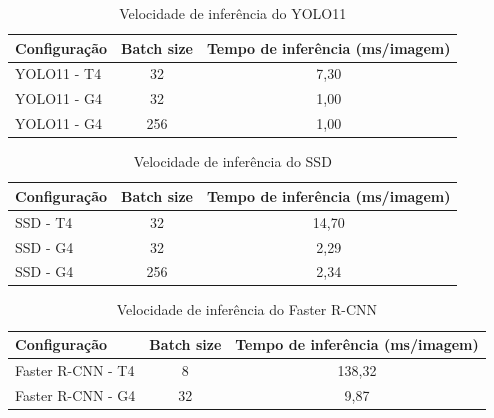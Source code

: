 \begin{table}[H]
    \caption{Velocidade de inferência do YOLO11}
    \label{tab:inferencia-yolo11}
    \centering
    \small
    \begin{tabular}{lcc}
        \toprule
        \textbf{Configuração} & \textbf{Batch size} & \textbf{Tempo de inferência (ms/imagem)} \\
        \midrule
        YOLO11 - T4  & 32  & 7,30 \\
        YOLO11 - G4  & 32  & 1,00 \\
        YOLO11 - G4  & 256 & 1,00 \\
        \bottomrule
    \end{tabular}
\end{table}
\vspace{-1em}

\begin{table}[H]
    \caption{Velocidade de inferência do SSD}
    \label{tab:inferencia-ssd}
    \centering
    \small
    \begin{tabular}{lcc}
        \toprule
        \textbf{Configuração} & \textbf{Batch size} & \textbf{Tempo de inferência (ms/imagem)} \\
        \midrule
        SSD - T4  & 32  & 14,70 \\
        SSD - G4  & 32  & 2,29 \\
        SSD - G4  & 256 & 2,34 \\
        \bottomrule
    \end{tabular}
\end{table}
\vspace{-1em}

\begin{table}[H]
    \caption{Velocidade de inferência do Faster R-CNN}
    \label{tab:inferencia-faster-rcnn}
    \centering
    \small
    \begin{tabular}{lcc}
        \toprule
        \textbf{Configuração} & \textbf{Batch size} & \textbf{Tempo de inferência (ms/imagem)} \\
        \midrule
        Faster R-CNN - T4 & 8  & 138,32 \\
        Faster R-CNN - G4 & 32 & 9,87 \\
        \bottomrule
    \end{tabular}
\end{table}
\vspace{-1em}

